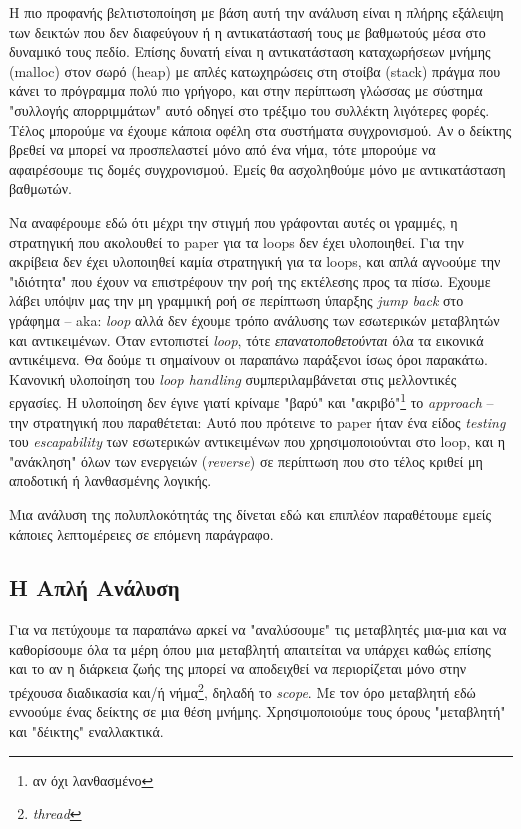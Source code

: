 Η πιο προφανής βελτιστοποίηση με βάση αυτή την ανάλυση είναι η πλήρης εξάλειψη
των δεικτών που δεν διαφεύγουν ή η αντικατάστασή τους με βαθμωτούς μέσα στο
δυναμικό τους πεδίο. Επίσης δυνατή είναι η αντικατάσταση καταχωρήσεων μνήμης
(malloc) στον σωρό (heap) με απλές κατωχηρώσεις στη στοίβα (stack) πράγμα που
κάνει το πρόγραμμα πολύ πιο γρήγορο, και στην περίπτωση γλώσσας με σύστημα
"συλλογής απορριμμάτων" αυτό οδηγεί στο τρέξιμο του συλλέκτη λιγότερες φορές.
Τέλος μπορούμε να έχουμε κάποια οφέλη στα συστήματα συγχρονισμού. Αν ο δείκτης
βρεθεί να μπορεί να προσπελαστεί μόνο από ένα νήμα, τότε μπορούμε να 
αφαιρέσουμε τις δομές συγχρονισμού. Εμείς θα ασχοληθούμε μόνο με αντικατάσταση 
βαθμωτών.

Να αναφέρουμε εδώ ότι μέχρι την στιγμή που γράφονται αυτές οι γραμμές, η
στρατηγική που ακολουθεί το paper για τα loops δεν έχει υλοποιηθεί. Για την
ακρίβεια δεν έχει υλοποιηθεί καμία στρατηγική για τα loops, και απλά αγνoούμε
την "ιδιότητα" που έχουν να επιστρέφουν την ροή της εκτέλεσης προς τα πίσω.
Εχουμε λάβει υπόψιν μας την μη γραμμική ροή σε περίπτωση ύπαρξης \textit{jump
back} στο γράφημα – aka: \textit{loop} αλλά δεν έχουμε τρόπο ανάλυσης των
εσωτερικών μεταβλητών και αντικειμένων. Όταν εντοπιστεί \textit{loop}, τότε
\textit{επανατοποθετούνται} όλα τα εικονικά αντικέιμενα. Θα δούμε τι σημαίνουν
οι παραπάνω παράξενοι ίσως όροι παρακάτω. Κανονική υλοποίηση του \textit{loop
handling} συμπεριλαμβάνεται στις μελλοντικές εργασίες. Η υλοποίηση δεν έγινε
γιατί κρίναμε "βαρύ" και "ακριβό"\footnote{αν όχι λανθασμένο} το
\textit{approach} – την στρατηγική που παραθέτεται: Αυτό που πρότεινε το paper
ήταν ένα είδος \textit{testing} του \textit{escapability} των εσωτερικών
αντικειμένων που χρησιμοποιούνται στο loop, και η "ανάκληση" όλων των ενεργειών
(\textit{reverse}) σε περίπτωση που στο τέλος κριθεί μη αποδοτική ή λανθασμένης
λογικής.

Μια ανάλυση της πολυπλοκότητάς της δίνεται εδώ\cite{complexity} και επιπλέον
παραθέτουμε εμείς κάποιες λεπτομέρειες σε επόμενη παράγραφο.


\subsection{Η Απλή Ανάλυση}

Για να πετύχουμε τα παραπάνω αρκεί να "αναλύσουμε" τις μεταβλητές μια-μια και να
καθορίσουμε όλα τα μέρη όπου μια μεταβλητή απαιτείται να υπάρχει καθώς επίσης
και το αν η διάρκεια ζωής της μπορεί να αποδειχθεί να περιορίζεται μόνο στην
τρέχουσα διαδικασία και/ή νήμα\footnote{\textit{thread}}, δηλαδή το
\textit{scope}. Με τον όρο μεταβλητή εδώ εννοούμε ένας δείκτης σε μια θέση
μνήμης. Χρησιμοποιούμε τους όρους "μεταβλητή" και "δέικτης" εναλλακτικά.

